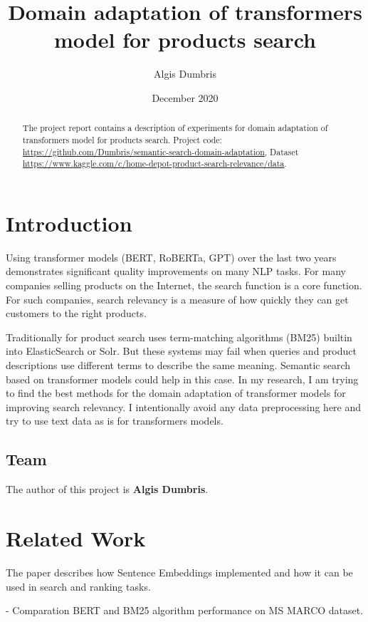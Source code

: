 \documentclass{article}
\title{Domain adaptation of transformers model for products search}
\author{Algis Dumbris}
\date{December 2020}
\begin{document}
\maketitle
\begin{abstract}
    The project report contains a description of experiments for domain adaptation of transformers model for products search. Project code: \url{https://github.com/Dumbris/semantic-search-domain-adaptation}, Dataset \url{https://www.kaggle.com/c/home-depot-product-search-relevance/data}.
\end{abstract}



\section{Introduction}
	Using transformer models (BERT, RoBERTa, GPT) over the last two years demonstrates significant quality improvements on many NLP tasks. 
	For many companies selling products on the Internet, the search function is a core function. For such companies, search relevancy is a measure of how quickly they can get customers to the right products. 
	
	Traditionally for product search uses term-matching algorithms (BM25) builtin into ElasticSearch or Solr. But these systems may fail when queries and product descriptions use different terms to describe the same meaning. Semantic search based on transformer models could help in this case.
In my research, I am trying to find the best methods for the domain adaptation of transformer models for improving search relevancy. I intentionally avoid any data preprocessing here and try to use text data as is for transformers models. 
\subsection{Team}
The author of this project is \textbf{Algis Dumbris}.



\section{Related Work}
\label{sec:related}

The paper \cite{reimers-2019-sentence-bert} describes how Sentence Embeddings implemented and how it can be used in search and ranking tasks.

\cite{padigela2019investigating} - Comparation BERT and BM25 algorithm performance on MS MARCO dataset.
\end{document}
